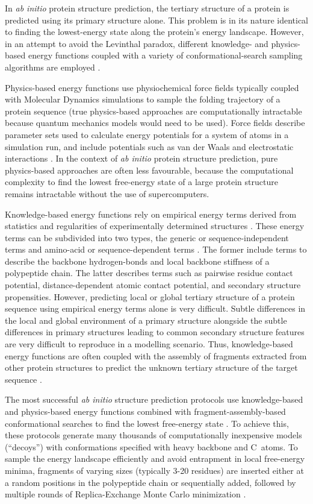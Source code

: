 In \textit{ab initio} protein structure prediction, the tertiary structure of a protein is predicted using its primary structure alone. This problem is in its nature identical to finding the lowest-energy state along the protein's energy landscape. However, in an attempt to avoid the Levinthal paradox, different knowledge- and physics-based energy functions coupled with a variety of conformational-search sampling algorithms are employed \cite{Lee2017-oc}. 

Physics-based energy functions use physiochemical force fields typically coupled with Molecular Dynamics simulations to sample the folding trajectory of a protein sequence (true physics-based approaches are computationally intractable because quantum mechanics models would need to be used). Force fields describe parameter sets used to calculate energy potentials for a system of atoms in a simulation run, and include potentials such as van der Waals and electrostatic interactions \cite{Lee2017-oc}. In the context of \textit{ab initio} protein structure prediction, pure physics-based approaches are often less favourable, because the computational complexity to find the lowest free-energy state of a large protein structure remains intractable without the use of supercomputers.

Knowledge-based energy functions rely on empirical energy terms derived from statistics and regularities of experimentally determined structures \cite{Lee2017-oc}. These energy terms can be subdivided into two types, the generic or sequence-independent terms and amino-acid or sequence-dependent terms \cite{Skolnick2006-uv}. The former include terms to describe the backbone hydrogen-bonds and local backbone stiffness of a polypeptide chain. The latter describes terms such as pairwise residue contact potential, distance-dependent atomic contact potential, and secondary structure propensities. However, predicting local or global tertiary structure of a protein sequence using empirical energy terms alone is very difficult. Subtle differences in the local and global environment of a primary structure alongside the subtle differences in primary structures leading to common secondary structure features are very difficult to reproduce in a modelling scenario. Thus, knowledge-based energy functions are often coupled with the assembly of fragments extracted from other protein structures to predict the unknown tertiary structure of the target sequence \cite{Lee2017-oc}. 

The most successful \textit{ab initio} structure prediction protocols use knowledge-based and physics-based energy functions combined with fragment-assembly-based conformational searches to find the lowest free-energy state \cite{Rohl2004-dj,Xu2012-jf,De_Oliveira2017-sg}. To achieve this, these protocols generate many thousands of computationally inexpensive models (``decoys'') with conformations specified with heavy backbone and C\textbeta\ atoms. To sample the energy landscape efficiently and avoid entrapment in local free-energy minima, fragments of varying sizes (typically 3-20 residues) are inserted either at a random positions in the polypeptide chain or sequentially added, followed by multiple rounds of Replica-Exchange Monte Carlo minimization \cite{Raman2009-gc,Xu2012-jf,Blaszczyk2013-nx,Kosciolek2014-bt}.
